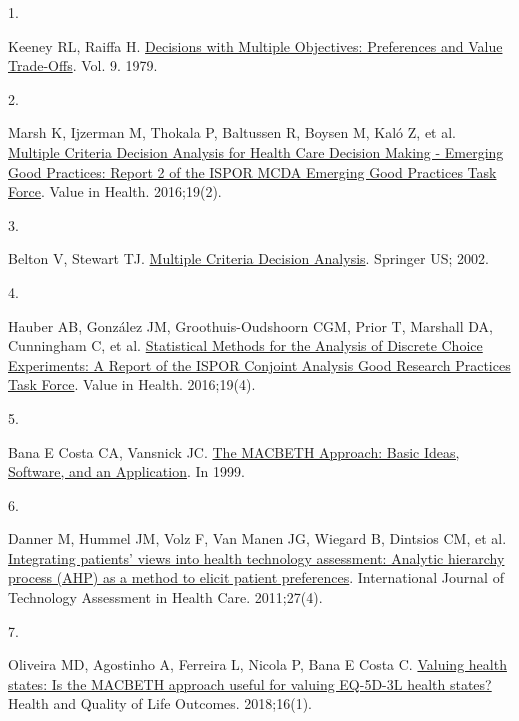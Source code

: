 \documentclass[
  letterpaper,
  DIV=11,
  numbers=noendperiod]{scrartcl}
\newlength{\cslhangindent}
\newlength{\csllabelwidth}
\newenvironment{CSLReferences}[2] %
 {\begin{list}{}{%
  \setlength{\itemindent}{0pt}
  \setlength{\leftmargin}{0pt}
  \setlength{\parsep}{0pt}
  \ifodd #1
   \setlength{\leftmargin}{\cslhangindent}
   \setlength{\itemindent}{-1\cslhangindent}
  \fi
  \setlength{\itemsep}{#2\baselineskip}}}
 {\end{list}}
\newcommand{\CSLLeftMargin}[1]{\parbox[t]{\csllabelwidth}{\strut#1\strut}}
\newcommand{\CSLRightInline}[1]{\parbox[t]{\linewidth - \csllabelwidth}{\strut#1\strut}}
\begin{document}
\begin{longtable}[]{@{}lrrr@{}}
\end{longtable}

\label{refs}
\begin{CSLReferences}{0}{1}
\CSLLeftMargin{1. }%
\CSLRightInline{Keeney RL, Raiffa H.
\href{https://doi.org/10.1109/TSMC.1979.4310245}{{Decisions with
Multiple Objectives: Preferences and Value Trade-Offs}}. Vol. 9. 1979. }

\CSLLeftMargin{2. }%
\CSLRightInline{Marsh K, Ijzerman M, Thokala P, Baltussen R, Boysen M,
Kaló Z, et al.
\href{https://doi.org/10.1016/j.jval.2015.12.016}{{Multiple Criteria
Decision Analysis for Health Care Decision Making - Emerging Good
Practices: Report 2 of the ISPOR MCDA Emerging Good Practices Task
Force}}. Value in Health. 2016;19(2). }

\CSLLeftMargin{3. }%
\CSLRightInline{Belton V, Stewart TJ.
\href{https://doi.org/10.1007/978-1-4615-1495-4}{{Multiple Criteria
Decision Analysis}}. Springer US; 2002. }

\CSLLeftMargin{4. }%
\CSLRightInline{Hauber AB, González JM, Groothuis-Oudshoorn CGM, Prior
T, Marshall DA, Cunningham C, et al.
\href{https://doi.org/10.1016/j.jval.2016.04.004}{{Statistical Methods
for the Analysis of Discrete Choice Experiments: A Report of the ISPOR
Conjoint Analysis Good Research Practices Task Force}}. Value in Health.
2016;19(4). }

\CSLLeftMargin{5. }%
\CSLRightInline{Bana E Costa CA, Vansnick JC.
\href{https://doi.org/10.1007/978-94-017-0647-6\%7B/_\%7D9}{{The MACBETH
Approach: Basic Ideas, Software, and an Application}}. In 1999. }

\CSLLeftMargin{6. }%
\CSLRightInline{Danner M, Hummel JM, Volz F, Van Manen JG, Wiegard B,
Dintsios CM, et al.
\href{https://doi.org/10.1017/S0266462311000523}{{Integrating patients'
views into health technology assessment: Analytic hierarchy process
(AHP) as a method to elicit patient preferences}}. International Journal
of Technology Assessment in Health Care. 2011;27(4). }

\CSLLeftMargin{7. }%
\CSLRightInline{Oliveira MD, Agostinho A, Ferreira L, Nicola P, Bana E
Costa C. \href{https://doi.org/10.1186/s12955-018-1056-y}{{Valuing
health states: Is the MACBETH approach useful for valuing EQ-5D-3L
health states?}} Health and Quality of Life Outcomes. 2018;16(1). }


\end{CSLReferences}
\end{document}
